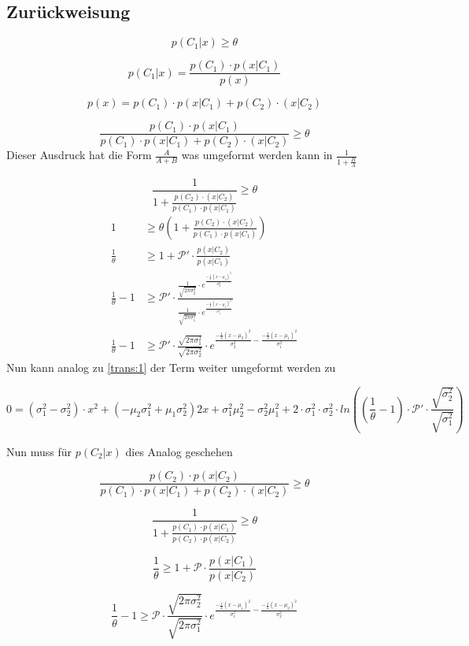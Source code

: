 \documentclass{article}
\begin{document}
\subsection{Zurückweisung}
$$p(C_1 | x) \ge \theta $$

$$ p(C_1 | x) = \frac{p(C_1) \cdot p(x| C_1)}{p(x)}$$

$$p(x) = p(C_1) \cdot p(x | C_1) + p(C_2) \cdotp(x| C_2) $$

$$ \frac{p(C_1) \cdot p(x| C_1)}{p(C_1) \cdot p(x | C_1) + p(C_2) \cdotp(x| C_2)} \ge \theta$$
Dieser Ausdruck hat die Form $\frac{A}{A+B}$ was umgeformt werden kann in $\frac{1}{1+\frac{B}{A}}$


$$ \frac{1}{1+\frac{p(C_2) \cdotp(x| C_2)}{p(C_1) \cdot p(x| C_1)}} \ge \theta$$
\begin{align}
1 &\ge \theta (1+\frac{p(C_2) \cdotp(x| C_2)}{p(C_1) \cdot p(x| C_1)}) 
\\
\frac{1}{\theta} &\ge 1+ \mathcal{P}' \cdot \frac{p(x| C_2)}{ p(x| C_1)}
\\
 \frac{1}{\theta} - 1 &\ge
\mathcal{P}' \cdot \frac{\frac{1}{\sqrt{2\pi \sigma^{2}_2}} \cdot e^{\frac{-\frac{1}{2}(x-\mu_2)^2}{\sigma_{2}^2}}}{\frac{1}{\sqrt{2\pi \sigma^{2}_1}} \cdot e^{\frac{-\frac{1}{2}(x-\mu_1)^2}{\sigma_{1}^2}}} 
\\
  \frac{1}{\theta} - 1 &\ge 
\mathcal{P}' \cdot
\frac{\sqrt{2\pi \sigma^{2}_1}}{\sqrt{2\pi \sigma^{2}_2}}
 \cdot e^{\frac{-\frac{1}{2}(x-\mu_2)^2}{\sigma_{2}^2} - \frac{-\frac{1}{2}(x-\mu_1)^2}{\sigma_{1}^2}}
\end{align}
Nun kann analog zu \ref{trans:1} der Term weiter umgeformt werden zu 

$$ 0 = (\sigma_{1}^2 - \sigma_{2}^2) \cdot x^2 +
(-\mu_{2}\sigma_{1}^2 + \mu_{1} \sigma_{2}^2)2x 
+ \sigma_{1}^2 \mu_{2}^2 - \sigma_{2}^2\mu_{1}^2 
+ 2 \cdot \sigma_{1}^2 
\cdot \sigma_{2}^2 
\cdot ln((\frac{1}{\theta} - 1) 
\cdot \mathcal{P}' 
\cdot \frac{\sqrt{\sigma^{2}_2}}{\sqrt{ \sigma^{2}_1}}) 
$$

Nun muss für $p(C_2 | x)$ dies Analog geschehen

$$ \frac{p(C_2) \cdot p(x| C_2)}{p(C_1) \cdot p(x | C_1) + p(C_2) \cdotp(x| C_2)} \ge \theta$$

$$ \frac{1}{1+ \frac{p(C_1) \cdot p(x | C_1)}{p(C_2) \cdot p(x| C_2)}} \ge \theta$$

$$ \frac{1}{\theta} \ge 1+ \mathcal{P} \cdot \frac{p(x| C_1)}{ p(x| C_2)}$$ 


$$  \frac{1}{\theta} - 1 \ge 
\mathcal{P} \cdot
\frac{\sqrt{2\pi \sigma^{2}_2}}{\sqrt{2\pi \sigma^{2}_1}}
\cdot e^{\frac{-\frac{1}{2}(x-\mu_1)^2}{\sigma_{1}^2} - \frac{-\frac{1}{2}(x-\mu_2)^2}{\sigma_{2}^2}}$$
\end{document}
